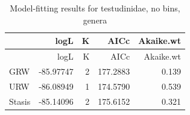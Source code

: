 \documentclass[]{article}
\begin{document}
\begin{longtable}[]{@{}lrrrr@{}}
\caption{Model-fitting results for testudinidae, no bins,
genera}\tabularnewline
\toprule
& logL & K & AICc & Akaike.wt\tabularnewline
\midrule
\endfirsthead
\toprule
& logL & K & AICc & Akaike.wt\tabularnewline
\midrule
\endhead
GRW & -85.97747 & 2 & 177.2883 & 0.139\tabularnewline
URW & -86.08949 & 1 & 174.5790 & 0.539\tabularnewline
Stasis & -85.14096 & 2 & 175.6152 & 0.321\tabularnewline
\bottomrule
\end{longtable}
\end{document}
